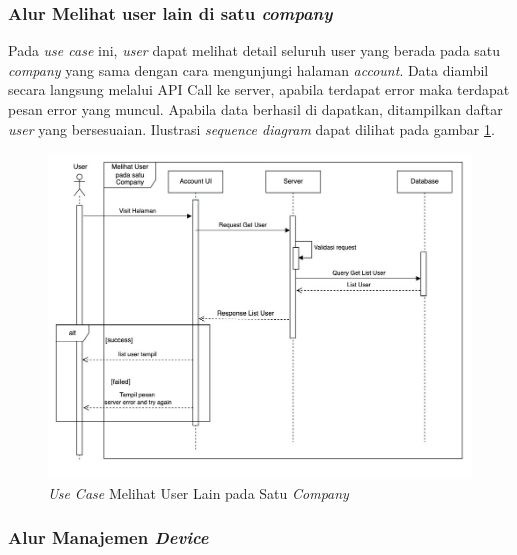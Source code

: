 \pagebreak

\subsubsection{Alur Melihat user lain di satu \textit{company}}

Pada \textit{use case} ini, \textit{user} dapat melihat detail seluruh user yang berada pada satu \textit{company} yang sama dengan cara mengunjungi halaman \textit{account}. Data diambil secara langsung melalui API Call ke server, apabila terdapat error maka terdapat pesan error yang muncul. Apabila data berhasil di dapatkan, ditampilkan daftar \textit{user} yang bersesuaian. Ilustrasi \textit{sequence diagram} dapat dilihat pada gambar \ref{fig:usecase-07}.


\begin{figure}[ht]
  \centering
  \includegraphics[width=1\textwidth]{resources/chapter-3/usecase/uc-07.jpg}
  \caption{\textit{Use Case} Melihat User Lain pada Satu \textit{Company}}
  \label{fig:usecase-07}
\end{figure}

\pagebreak

\subsubsection{Alur Manajemen \textit{Device}}


